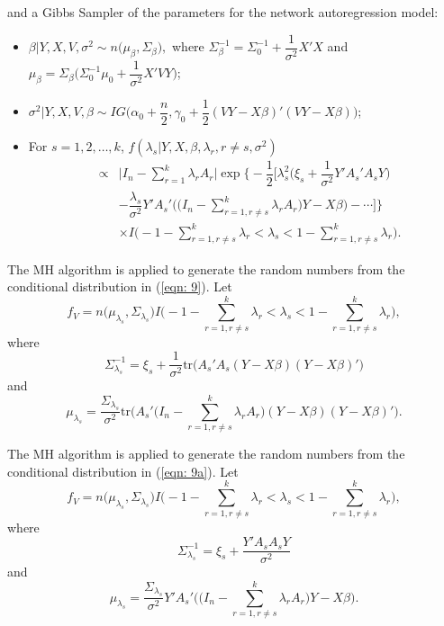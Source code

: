 \documentclass[times, doublespace]{auth}
\begin{document}
and a Gibbs Sampler of the parameters for the network autoregression model:
\begin{itemize}
	\item  $\beta \vert Y, X, V, \sigma^{2} \sim n\bigg(\mu_{\beta}, \Sigma_{\beta}\bigg),$ where $\Sigma_{\beta}^{-1} = \Sigma_{0}^{-1} + \dfrac{1}{\sigma^{2}}X'X$ and \\ 
	$\mu_{\beta} = \Sigma_{\beta}\bigg(\Sigma_{0}^{-1}\mu_{0} + \dfrac{1}{\sigma^{2}}X'VY\bigg)$;
	\item $\sigma^{2} \vert Y, X, V, \beta \sim IG\bigg(\alpha_{0} + \dfrac{n}{2}, \gamma_{0}+\dfrac{1}{2}(VY-X\beta)'(VY-X\beta)\bigg)$;
	\item For $s = 1,2, \ldots, k$, 
	\newline
	\noindent $f(\lambda_{s}\vert Y, X, \beta, \lambda_{r}, r \ne s, \sigma^{2})$
	\begin{equation}
	\label{eqn: 9a}
	\begin{aligned}
	& \propto & \big\vert I_{n} - \sum\limits_{r=1}^{k} \lambda_{r}A_{r}\big\vert \exp\bigg\{-\dfrac{1}{2}\bigg[\lambda_{s}^{2}\bigg(\xi_{s} + \dfrac{1}{\sigma^{2}}Y'A_{s}'A_{s}Y\bigg)\\
	&& -\dfrac{\lambda_{s}}{\sigma^{2}}Y'A_{s}'\bigg(\bigg(I_{n}-\sum\limits_{r=1, r \ne s}^{k} \lambda_{r}A_{r}\bigg)Y-X\beta\bigg)-\cdots\bigg]\bigg\}\\
	&& \times I\bigg(-1-\sum\limits_{r=1, r \ne s}^{k}\lambda_{r} < \lambda_{s} < 1- \sum\limits_{r=1, r \ne s}^{k}\lambda_{r}\bigg).
	\end{aligned}
	\end{equation}
\end{itemize}
	The MH algorithm is applied to generate the random numbers from the conditional distribution in (\ref{eqn: 9}). Let 
	\[
	f_{V} = n\big(\mu_{\lambda_{s}}, \Sigma_{\lambda_{s}}\big)I\bigg(-1-\sum\limits_{r=1, r \ne s}^{k}\lambda_{r} < \lambda_{s} < 1- \sum\limits_{r=1, r \ne s}^{k}\lambda_{r}\bigg),
	\]
	where 
	\[
	\Sigma_{\lambda_{s}}^{-1} = \xi_{s} + \dfrac{1}{\sigma^{2}}\text{tr}\big(A_{s}'A_{s}(Y-X\beta)(Y-X\beta)'\big)
	\]
	and 
	\[
	\mu_{\lambda_{s}} = \dfrac{\Sigma_{\lambda_{s}}}{\sigma^{2}}\text{tr}\bigg(A_{s}'\bigg(I_{n}-\sum\limits_{r=1, r \ne s}^{k} \lambda_{r}A_{r}\bigg)(Y-X\beta)(Y-X\beta)'\bigg).
	\]
	
	\noindent The MH algorithm is applied to generate the random numbers from the conditional distribution in (\ref{eqn: 9a}). Let 
	\[
	f_{V} = n\big(\mu_{\lambda_{s}}, \Sigma_{\lambda_{s}}\big)I\bigg(-1-\sum\limits_{r=1, r \ne s}^{k}\lambda_{r} < \lambda_{s} < 1- \sum\limits_{r=1, r \ne s}^{k}\lambda_{r}\bigg),
	\]
	where 
	\[
	\Sigma_{\lambda_{s}}^{-1} = \xi_{s} + \dfrac{Y'A_{s}A_{s}Y}{\sigma^{2}}
	\]
	and 
	\[
	\mu_{\lambda_{s}} = \dfrac{\Sigma_{\lambda_{s}}}{\sigma^{2}}Y'A_{s}'\bigg(\bigg(I_{n}-\sum\limits_{r=1, r \ne s}^{k} \lambda_{r}A_{r}\bigg)Y - X\beta\bigg).
	\]
	
\end{document}
